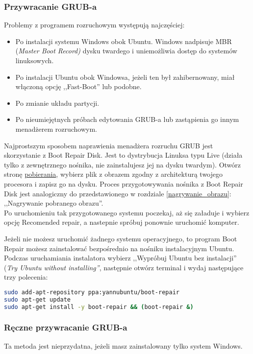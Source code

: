 \subsubsection{Przywracanie GRUB-a}
\label{grub_przywracanie}
Problemy z programem rozruchowym występują najczęściej:
\begin{itemize}
\item Po instalacji systemu Windows obok Ubuntu. Windows nadpisuje MBR (\textit{Master Boot Record)} dysku twardego i uniemożliwia dostęp do systemów linuksowych.
\item Po instalacji Ubuntu obok Windowsa, jeżeli ten był zahibernowany, miał włączoną opcję ,,Fast-Boot'' lub podobne.
\item Po zmianie układu partycji.
\item Po nieumiejętnych próbach edytowania GRUB-a lub zastąpienia go innym menadżerem rozruchowym.
\end{itemize}

Najprostszym sposobem naprawienia menadżera rozruchu GRUB jest skorzystanie z Boot Repair Disk. Jest to dystrybucja Linuksa typu Live (działa tylko z zewnętrznego nośnika, nie zainstalujesz jej na dysku twardym). Otwórz stronę \href{http://sourceforge.net/projects/boot-repair-cd/files/}{pobierania}, wybierz plik z obrazem zgodny z architekturą twojego procesora i zapisz go na dysku. Proces przygotowywania nośnika z Boot Repair Disk jest analogiczny do przedstawionego w rozdziale \ref{nagrywanie_obrazu}: ,,Nagrywanie pobranego obrazu''.\\
Po uruchomieniu tak przygotowanego systemu poczekaj, aż się załaduje i wybierz opcję \textcolor{ubuntu_orange}{Recomended repair}, a nastepnie spróbuj ponownie uruchomić komputer.

Jeżeli nie możesz uruchomić żadnego systemu operacyjnego, to program Boot Repair możesz zainstalować bezpośrednio na nośniku instalacyjnym Ubuntu. Podczas uruchamiania instalatora wybierz ,,Wypróbuj Ubuntu bez instalacji'' (\textit{Try Ubuntu without installing''}, następnie otwórz terminal  i wydaj następujące trzy polecenia:

\begin{lstlisting}[language=bash]
sudo add-apt-repository ppa:yannubuntu/boot-repair
sudo apt-get update
sudo apt-get install -y boot-repair && (boot-repair &)
\end{lstlisting}

\subsubsection{Ręczne przywracanie GRUB-a}
Ta metoda jest nieprzydatna, jeżeli masz zainstalowany tylko system Windows.

